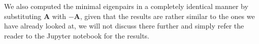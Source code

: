 \documentclass[reprint, english, nofootinbib]{revtex4-2}
\begin{document}
We also computed the minimal eigenpairs in a completely identical manner by substituting $\mathbf A$ with $- \mathbf A$, given that the results are rather similar to the ones we have already looked at, we will not discuss there further and simply refer the reader to the Jupyter notebook for the results.


\end{document}
